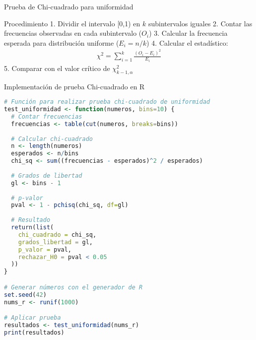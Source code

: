 \documentclass[aspectratio=169]{beamer}
\begin{document}
\begin{frame}{Prueba de Chi-cuadrado para uniformidad}
    \begin{block}{Procedimiento}
        1. Dividir el intervalo [0,1) en $k$ subintervalos iguales
        2. Contar las frecuencias observadas en cada subintervalo ($O_i$)
        3. Calcular la frecuencia esperada para distribución uniforme ($E_i = n/k$)
        4. Calcular el estadístico:
        \begin{align}
        \chi^2 = \sum_{i=1}^{k} \frac{(O_i - E_i)^2}{E_i}
        \end{align}
        5. Comparar con el valor crítico de $\chi^2_{k-1,\alpha}$
    \end{block}
\end{frame}

\begin{frame}{Implementación de prueba Chi-cuadrado en R}
    \begin{lstlisting}[language=R]
# Función para realizar prueba chi-cuadrado de uniformidad
test_uniformidad <- function(numeros, bins=10) {
  # Contar frecuencias
  frecuencias <- table(cut(numeros, breaks=bins))
  
  # Calcular chi-cuadrado
  n <- length(numeros)
  esperados <- n/bins
  chi_sq <- sum((frecuencias - esperados)^2 / esperados)
  
  # Grados de libertad
  gl <- bins - 1
  
  # p-valor
  pval <- 1 - pchisq(chi_sq, df=gl)
  
  # Resultado
  return(list(
    chi_cuadrado = chi_sq,
    grados_libertad = gl,
    p_valor = pval,
    rechazar_H0 = pval < 0.05
  ))
}

# Generar números con el generador de R
set.seed(42)
nums_r <- runif(1000)

# Aplicar prueba
resultados <- test_uniformidad(nums_r)
print(resultados)
    \end{lstlisting}
\end{frame}
\end{document}
